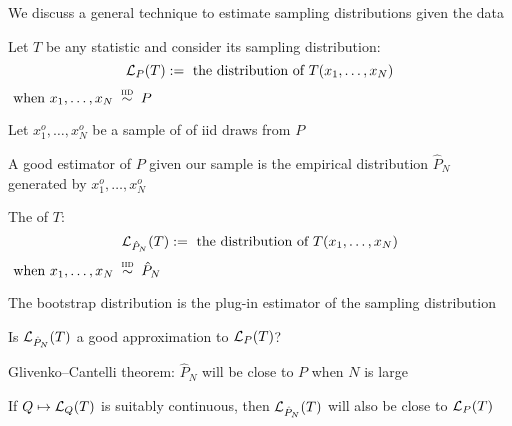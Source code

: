 \begin{frame}
    
    \vspace{2em}
    We discuss a general technique to estimate sampling distributions given the data
    
    \vspace{.7em}
    Let $T$ be any statistic and consider its
    sampling distribution:
    \begin{equation*}
        \mathcal L_P(T) 
        := \text{ the distribution of }
        T(x_1, \ldots, x_N) 
    \end{equation*}
    $\text{ when } x_1, \ldots, x_N \stackrel {\textrm{ {\sc iid }}} {\sim} P$
    
    \vspace{.7em}
    Let $x^o_1, \ldots,
    x^o_N$ be a sample of of {\sc iid} draws from $P$
    
    A good estimator of $P$
    given our sample is the empirical distribution $\hat P_N$ generated by $x^o_1,
    \ldots, x^o_N$
    
\end{frame}

\begin{frame}

    \vspace{2em}
    The  of $T$:
    \begin{equation*}
        \mathcal L_{\hat P_N}(T) 
        := \text{ the distribution of }
        T(x_1, \ldots, x_N) 
    \end{equation*}
    $\text{ when } x_1, \ldots, x_N \stackrel {\textrm{ {\sc iid }}} {\sim} \hat P_N$
    
    \vspace{.7em}
    The bootstrap distribution is the plug-in estimator of
    the sampling distribution
    
    Is $\mathcal L_{\hat P_N}(T)$ a good approximation to $\mathcal L_P(T)$?
    
    \vspace{.7em}
    Glivenko--Cantelli theorem: $\hat P_N$ will be close to $P$ when $N$ is large
    
    If $Q \mapsto \mathcal L_Q(T)$ is suitably continuous, then 
    $\mathcal L_{\hat P_N}(T)$ will also be close
    to $\mathcal L_P(T)$
    
\end{frame}

